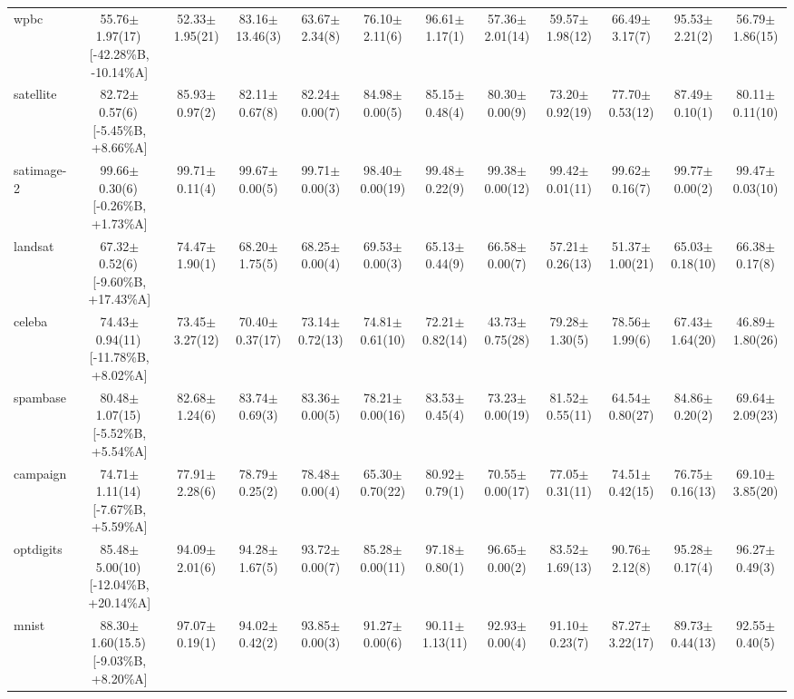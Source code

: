 \documentclass[conference]{IEEEtran}
\begin{document}
\begin{table}
{\begin{tabular}{lccccccccccc}
				wpbc & 55.76$\pm$1.97(17)\,[{-}42.28\%B, {-}10.14\%A] & 52.33$\pm$1.95(21) & 83.16$\pm$13.46(3) & 63.67$\pm$2.34(8) & 76.10$\pm$2.11(6) & 96.61$\pm$1.17(1) & 57.36$\pm$2.01(14) & 59.57$\pm$1.98(12) & 66.49$\pm$3.17(7) & 95.53$\pm$2.21(2) & 56.79$\pm$1.86(15) \\
				satellite & 82.72$\pm$0.57(6)\,[{-}5.45\%B, {+}8.66\%A] & 85.93$\pm$0.97(2) & 82.11$\pm$0.67(8) & 82.24$\pm$0.00(7) & 84.98$\pm$0.00(5) & 85.15$\pm$0.48(4) & 80.30$\pm$0.00(9) & 73.20$\pm$0.92(19) & 77.70$\pm$0.53(12) & 87.49$\pm$0.10(1) & 80.11$\pm$0.11(10) \\
				satimage-2 & 99.66$\pm$0.30(6)\,[{-}0.26\%B, {+}1.73\%A] & 99.71$\pm$0.11(4) & 99.67$\pm$0.00(5) & 99.71$\pm$0.00(3) & 98.40$\pm$0.00(19) & 99.48$\pm$0.22(9) & 99.38$\pm$0.00(12) & 99.42$\pm$0.01(11) & 99.62$\pm$0.16(7) & 99.77$\pm$0.00(2) & 99.47$\pm$0.03(10) \\
				landsat & 67.32$\pm$0.52(6)\,[{-}9.60\%B, {+}17.43\%A] & 74.47$\pm$1.90(1) & 68.20$\pm$1.75(5) & 68.25$\pm$0.00(4) & 69.53$\pm$0.00(3) & 65.13$\pm$0.44(9) & 66.58$\pm$0.00(7) & 57.21$\pm$0.26(13) & 51.37$\pm$1.00(21) & 65.03$\pm$0.18(10) & 66.38$\pm$0.17(8) \\
				celeba & 74.43$\pm$0.94(11)\,[{-}11.78\%B, {+}8.02\%A] & 73.45$\pm$3.27(12) & 70.40$\pm$0.37(17) & 73.14$\pm$0.72(13) & 74.81$\pm$0.61(10) & 72.21$\pm$0.82(14) & 43.73$\pm$0.75(28) & 79.28$\pm$1.30(5) & 78.56$\pm$1.99(6) & 67.43$\pm$1.64(20) & 46.89$\pm$1.80(26) \\
				spambase & 80.48$\pm$1.07(15)\,[{-}5.52\%B, {+}5.54\%A] & 82.68$\pm$1.24(6) & 83.74$\pm$0.69(3) & 83.36$\pm$0.00(5) & 78.21$\pm$0.00(16) & 83.53$\pm$0.45(4) & 73.23$\pm$0.00(19) & 81.52$\pm$0.55(11) & 64.54$\pm$0.80(27) & 84.86$\pm$0.20(2) & 69.64$\pm$2.09(23) \\
				campaign & 74.71$\pm$1.11(14)\,[{-}7.67\%B, {+}5.59\%A] & 77.91$\pm$2.28(6) & 78.79$\pm$0.25(2) & 78.48$\pm$0.00(4) & 65.30$\pm$0.70(22) & 80.92$\pm$0.79(1) & 70.55$\pm$0.00(17) & 77.05$\pm$0.31(11) & 74.51$\pm$0.42(15) & 76.75$\pm$0.16(13) & 69.10$\pm$3.85(20) \\
				optdigits & 85.48$\pm$5.00(10)\,[{-}12.04\%B, {+}20.14\%A] & 94.09$\pm$2.01(6) & 94.28$\pm$1.67(5) & 93.72$\pm$0.00(7) & 85.28$\pm$0.00(11) & 97.18$\pm$0.80(1) & 96.65$\pm$0.00(2) & 83.52$\pm$1.69(13) & 90.76$\pm$2.12(8) & 95.28$\pm$0.17(4) & 96.27$\pm$0.49(3) \\
				mnist & 88.30$\pm$1.60(15.5)\,[{-}9.03\%B, {+}8.20\%A] & 97.07$\pm$0.19(1) & 94.02$\pm$0.42(2) & 93.85$\pm$0.00(3) & 91.27$\pm$0.00(6) & 90.11$\pm$1.13(11) & 92.93$\pm$0.00(4) & 91.10$\pm$0.23(7) & 87.27$\pm$3.22(17) & 89.73$\pm$0.44(13) & 92.55$\pm$0.40(5) \\

\end{tabular}}
\end{table}
\end{document}

